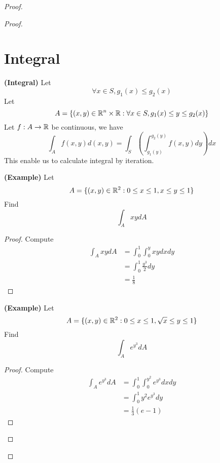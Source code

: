 \documentclass{report}
\begin{document}
\begin{proof}
\begin{proof}
\section{Integral}
\begin{theorem}
\label{5.6.1}
\textbf{(Integral)} Let 
 \begin{equation}
\forall x \in S, g_1(x)\leq g_2(x)
\end{equation}
Let  
\begin{equation}
A=\{ (x,y)\in \mathbb{R}^n \times \mathbb{R}: \forall x \in S, g_1(x)\leq y\leq g_2(x) \}
\end{equation}
Let $f:A \rightarrow \mathbb{R}$ be continuous, we have
\begin{equation}
\int_A f(x,y)d(x,y)=\int_S(\int_{g_1(y)}^{g_2(y)} f(x,y)dy)dx
\end{equation}
This enable us to calculate integral by iteration.  
\end{theorem}
\begin{theorem}
\label{5.6.2}
\textbf{(Example)} Let 
\begin{equation}
A=\{ (x,y)\in\mathbb{R}^2 : 0\leq x\leq 1, x\leq y\leq 1 \}
\end{equation}
Find
\begin{equation}
\int_A xydA
\end{equation}
\end{theorem}
\begin{proof}
Compute
\begin{align}
  \int_A xydA&=\int_0^1\int_0^y xy dxdy\\
  &=\int_0^1 \frac{y^3}{2}dy\\
  &=\frac{1}{8}
\end{align}
\end{proof}
\begin{theorem}
\label{5.6.3}
\textbf{(Example)} Let 
\begin{equation}
A=\{ (x,y)\in\mathbb{R}^2 :0\leq x\leq 1, \sqrt{x} \leq y\leq 1 \}
\end{equation}
Find 
\begin{equation}
\int_A e^{y^3}dA
\end{equation}
\end{theorem}
\begin{proof}
Compute
\begin{align}
  \int_A e^{y^3}dA&=\int^1_0\int^{y^2}_0 e^{y^3}dxdy\\
&=\int_0^1 y^2e^{y^3}dy\\
&=\frac{1}{3}(e-1)
\end{align}
\end{proof}

\end{proof}
\end{proof}
\end{document}
